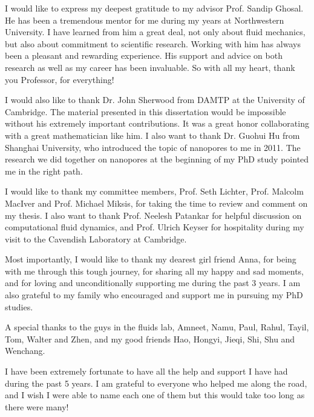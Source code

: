 \documentclass[12pt]{nuthesis}	%
\begin{document}
\acknowledgements	%
I would like to express my deepest gratitude to my advisor Prof. Sandip Ghosal. He has been a tremendous mentor for me during my years at Northwestern University. I have learned from him a great deal, not only about fluid mechanics, but also about commitment to scientific research. Working with him has always been a pleasant and rewarding experience. His support and advice on both research as well as my career has been invaluable. So with all my heart, thank you Professor, for everything!

I would also like to thank Dr. John Sherwood from DAMTP at the University of Cambridge. The material presented in this dissertation would be impossible without his extremely important contributions. It was a great honor collaborating with a great mathematician like him. I also want to thank Dr. Guohui Hu from Shanghai University, who introduced the topic of nanopores to me in 2011. The research we did together on nanopores at the beginning of my PhD study pointed me in the right path.

I would like to thank my committee members, Prof. Seth Lichter, Prof. Malcolm MacIver and Prof. Michael Miksis, for taking the time to review and comment on my thesis. I also want to thank Prof. Neelesh Patankar for helpful discussion on computational fluid dynamics, and Prof. Ulrich Keyser for hospitality during my visit to the Cavendish Laboratory at Cambridge.

Most importantly, I would like to thank my dearest girl friend Anna, for being with me through this tough journey, for sharing all my happy and sad moments, and for loving and unconditionally supporting me during the past 3 years. I am also grateful to my family who encouraged and support me in pursuing my PhD studies.

A special thanks to the guys in the fluids lab, Amneet, Namu, Paul, Rahul, Tayil, Tom, Walter and Zhen, and my good friends Hao, Hongyi, Jieqi, Shi, Shu and Wenchang.

I have been extremely fortunate to have all the help and support I have had during the past 5 years. I am grateful to everyone who helped me along the road, and I wish I were able to name each one of them but this would take too long as there were many! 

%

%
%
%
%
%
%
%
%
\end{document}
